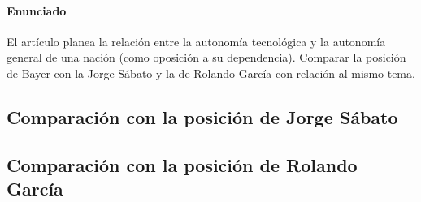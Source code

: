 \paragraph{Enunciado}
El artículo planea la relación entre la autonomía tecnológica y la autonomía
general de una nación (como oposición a su dependencia).
Comparar la posición de Bayer con la Jorge Sábato y la de Rolando García con relación al mismo tema.

\subsection*{Comparación con la posición de Jorge Sábato}



\subsection*{Comparación con la posición de Rolando García}


